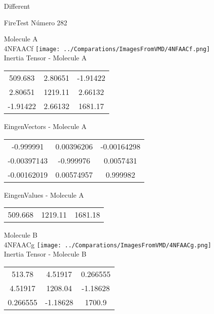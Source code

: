 \begin{center}
\vtab
\vtab
\textcolor{NavyBlue}{\Large Different}
\end{center}

 \newpage

\vtab[-2cm]
\begin{center}
{\large FireTest \tab Número 282}
\end{center}
\begin{multicols}{2}
\begin{center}

Molecule A \\ 
4NFAACf
\texttt{[image: ../Comparations/ImagesFromVMD/4NFAACf.png]}
\\
Inertia Tensor - Molecule A \\
\vtab

\begin{tabular}{|c c c|}
509.683	 & 	2.80651	 & 	-1.91422	 \\
2.80651	 & 	1219.11	 & 	2.66132	 \\
-1.91422	 & 	2.66132	 & 	1681.17
\end{tabular}

\vtab
 EingenVectors - Molecule A     \\
\vtab
\begin{tabular}{|c c c|}
-0.999991	 & 	0.00396206	 & 	-0.00164298	 \\
-0.00397143	 & 	-0.999976	 & 	0.0057431	 \\
-0.00162019	 & 	0.00574957	 & 	0.999982
\end{tabular}

\vtab
 EingenValues - Molecule A     \\
\vtab
\begin{tabular}{|c c c|}
509.668	 & 	1219.11	 & 	1681.18	 \\
\end{tabular}
\columnbreak

Molecule B \\ 
4NFAACg
\texttt{[image: ../Comparations/ImagesFromVMD/4NFAACg.png]}
\\
Inertia Tensor - Molecule B \\
\vtab

\begin{tabular}{|c c c|}
513.78	 & 	4.51917	 & 	0.266555	 \\
4.51917	 & 	1208.04	 & 	-1.18628	 \\
0.266555	 & 	-1.18628	 & 	1700.9
\end{tabular}


\end{center}
\end{multicols}

